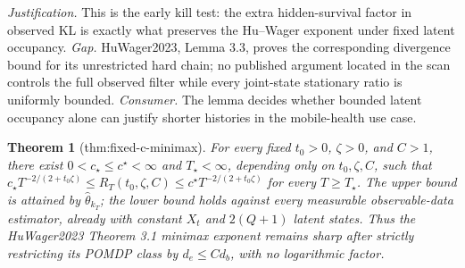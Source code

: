 \documentclass{article}
\newtheorem{theorem}{Theorem}
\begin{document}
\par\smallskip\noindent \textit{Justification.} This is the early kill test: the extra hidden-survival factor in observed KL is exactly what preserves the Hu--Wager exponent under fixed latent occupancy. \textit{Gap.} HuWager2023, Lemma 3.3, proves the corresponding divergence bound for its unrestricted hard chain; no published argument located in the scan controls the full observed filter while every joint-state stationary ratio is uniformly bounded. \textit{Consumer.} The lemma decides whether bounded latent occupancy alone can justify shorter histories in the mobile-health use case.

\begin{theorem}[thm:fixed-c-minimax]\label{thm:fixed-c-minimax}
For every fixed \(t_0>0\), \(\zeta>0\), and \(C>1\), there exist \(0<c_\star\le c^\star<\infty\) and \(T_\star<\infty\), depending only on \(t_0,\zeta,C\), such that \(c_\star T^{-2/(2+t_0\zeta)}\le R_T(t_0,\zeta,C)\le c^\star T^{-2/(2+t_0\zeta)}\) for every \(T\ge T_\star\). The upper bound is attained by \(\widehat\theta_{k_T}\); the lower bound holds against every measurable observable-data estimator, already with constant \(X_t\) and \(2(Q+1)\) latent states. Thus the HuWager2023 Theorem 3.1 minimax exponent remains sharp after strictly restricting its POMDP class by \(d_e\le Cd_b\), with no logarithmic factor.
\end{theorem}
\end{document}
